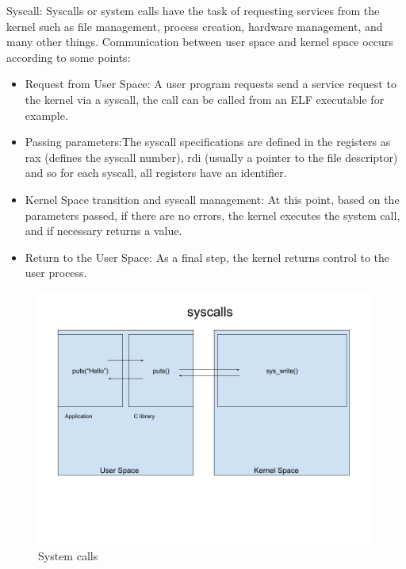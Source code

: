     Syscall: 
    Syscalls or system calls have the task of requesting services from the kernel such as file management, process creation, hardware management, and many other things.\newline
    Communication between user space and kernel space occurs according to some points:\newline
    \begin{itemize}
    \item Request from User Space: A user program requests send a service request to the kernel via a syscall, the call can be called from an ELF executable for example.\newline
    \item Passing parameters:The syscall specifications are defined in the registers as rax (defines the syscall number), rdi (usually a pointer to the file descriptor) and so for each syscall, all registers have an identifier.\newline
    \item Kernel Space transition and syscall management: At this point, based on the parameters passed, if there are no errors, the kernel executes the system call, and if necessary returns a value.\newline
    \item Return to the User Space: As a final step, the kernel returns control to the user process.\newline
\end{itemize}
    \begin{figure}[htbp]
        \centering
        \includegraphics[width=0.9\linewidth]{Images/syscall.png}
        \caption{System calls}
        \label{fig:enter-label}
    \end{figure}



